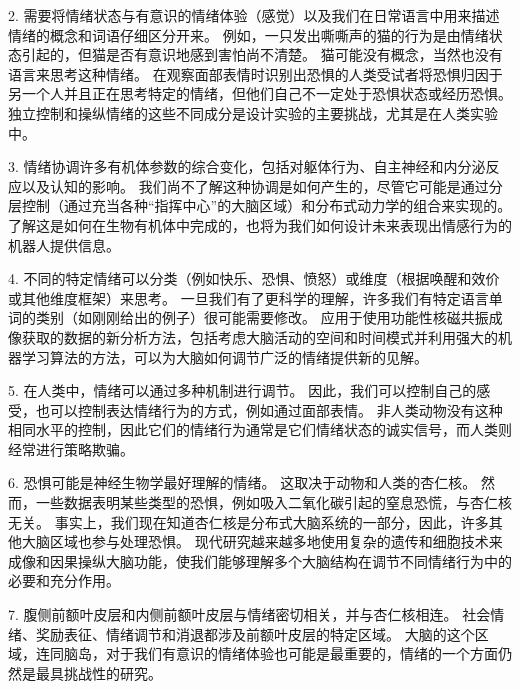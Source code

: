 2. 需要将情绪状态与有意识的情绪体验（感觉）以及我们在日常语言中用来描述情绪的概念和词语仔细区分开来。
例如，一只发出嘶嘶声的猫的行为是由情绪状态引起的，但猫是否有意识地感到害怕尚不清楚。
猫可能没有概念，当然也没有语言来思考这种情绪。
在观察面部表情时识别出恐惧的人类受试者将恐惧归因于另一个人并且正在思考特定的情绪，但他们自己不一定处于恐惧状态或经历恐惧。
独立控制和操纵情绪的这些不同成分是设计实验的主要挑战，尤其是在人类实验中。


3. 情绪协调许多有机体参数的综合变化，包括对躯体行为、自主神经和内分泌反应以及认知的影响。
我们尚不了解这种协调是如何产生的，尽管它可能是通过分层控制（通过充当各种“指挥中心”的大脑区域）和分布式动力学的组合来实现的。
了解这是如何在生物有机体中完成的，也将为我们如何设计未来表现出情感行为的机器人提供信息。


4. 不同的特定情绪可以分类（例如快乐、恐惧、愤怒）或维度（根据唤醒和效价或其他维度框架）来思考。
一旦我们有了更科学的理解，许多我们有特定语言单词的类别（如刚刚给出的例子）很可能需要修改。
应用于使用功能性核磁共振成像获取的数据的新分析方法，包括考虑大脑活动的空间和时间模式并利用强大的机器学习算法的方法，可以为大脑如何调节广泛的情绪提供新的见解。


5. 在人类中，情绪可以通过多种机制进行调节。
因此，我们可以控制自己的感受，也可以控制表达情绪行为的方式，例如通过面部表情。
非人类动物没有这种相同水平的控制，因此它们的情绪行为通常是它们情绪状态的诚实信号，而人类则经常进行策略欺骗。


6. 恐惧可能是神经生物学最好理解的情绪。
这取决于动物和人类的杏仁核。
然而，一些数据表明某些类型的恐惧，例如吸入二氧化碳引起的窒息恐慌，与杏仁核无关。
事实上，我们现在知道杏仁核是分布式大脑系统的一部分，因此，许多其他大脑区域也参与处理恐惧。
现代研究越来越多地使用复杂的遗传和细胞技术来成像和因果操纵大脑功能，使我们能够理解多个大脑结构在调节不同情绪行为中的必要和充分作用。


7. 腹侧前额叶皮层和内侧前额叶皮层与情绪密切相关，并与杏仁核相连。
社会情绪、奖励表征、情绪调节和消退都涉及前额叶皮层的特定区域。
大脑的这个区域，连同脑岛，对于我们有意识的情绪体验也可能是最重要的，情绪的一个方面仍然是最具挑战性的研究。

